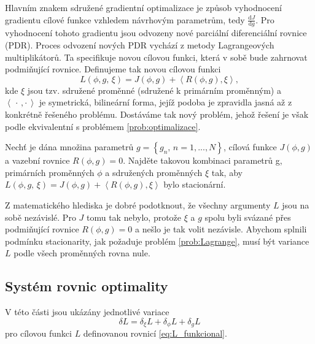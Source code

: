 Hlavním znakem sdružené gradientní optimalizace je způsob vyhodnocení gradientu cílové funkce vzhledem návrhovým parametrům, tedy $ \frac{\mathrm{d}J}{\mathrm{d}g} $. 
Pro vyhodnocení tohoto gradientu jsou odvozeny nové parciální diferenciální rovnice (PDR).
Proces odvození nových PDR vychází z metody Lagrangeových multiplikátorů. Ta specifikuje novou cílovou funkci, která v sobě bude zahrnovat podmiňující rovnice. 
Definujeme tak novou cílovou funkci 
\begin{equation}\label{eq:L_funkcional}
L(\phi, g,\,\xi) = J(\phi, g) + \left\langle R(\phi, g),\xi \right\rangle,
\end{equation}
kde $ \xi $ jsou tzv. sdružené proměnné (sdružené k primárním proměnným) a $  \left\langle \, \cdot\,,\cdot \,  \right\rangle $ je symetrická, bilineární forma, jejíž podoba je zpravidla jasná až z konkrétně řešeného problému.
Dostáváme tak nový problém, jehož řešení je však podle \cite{karman1997inverse} ekvivalentní s problémem \ref{prob:optimalizace}.

\begin{problem}\label{prob:Lagrange}
Nechť je dána množina parametrů $ g=\left\lbrace g_n, \, n=1,...,N\right\rbrace $, cílová funkce $ J(\phi, g) $ a vazební rovnice $ R(\phi, g)=0 $.
Najděte takovou kombinaci parametrů g, primárních proměnných $ \phi $ a sdružených proměnných $ \xi $ tak, aby $ L(\phi, g,\,\xi) = J(\phi, g) + \left\langle R(\phi, g),\xi \right\rangle$ bylo  stacionární.
\end{problem}

Z matematického hlediska je dobré podotknout, že všechny argumenty $ L $ jsou na sobě nezávislé. Pro $ J $ tomu tak nebylo, protože $ \xi $ a $ g $ spolu byli svázané přes podmiňující rovnice $ R(\phi, g)=0 $ a nešlo je tak volit nezávisle. Abychom splnili podmínku stacionarity, jak požaduje problém \ref{prob:Lagrange}, musí být variance $ L $ podle všech proměnných rovna nule.

\subsection{Systém rovnic optimality}
V této části jsou ukázány jednotlivé variace 
\begin{equation}\label{eq:L_variace}
\delta L = \delta_\xi L + \delta_\phi L + \delta_g L
\end{equation} 
pro cílovou funkci $ L $ definovanou rovnicí \ref{eq:L_funkcional}.
